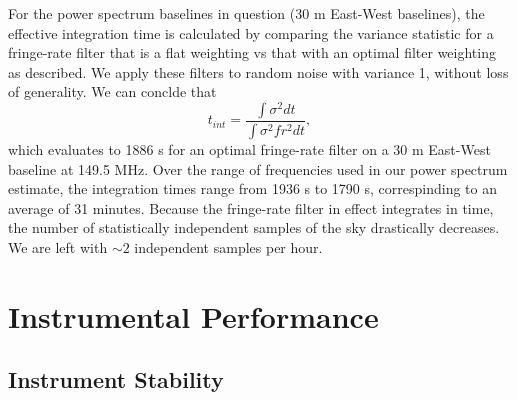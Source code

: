 \documentclass[twocolumn,numberedappendix]{emulateapj} \shorttitle{PSA64}
\begin{document}
For the power spectrum baselines in question (30 m East-West baselines), the
effective integration time is calculated by comparing the variance statistic for
a fringe-rate filter that is a flat weighting vs that with an optimal filter
weighting as described. We apply these filters to random noise with variance 1,
without loss of generality. We can conclde that 
\begin{equation}
    t_{int} = \frac{\int{\sigma^{2}dt}}{\int{\sigma^{2}fr^{2}dt}},
\end{equation}
which evaluates to 1886 s for an optimal fringe-rate filter on a 30 m East-West baseline at 149.5 MHz.
Over the range of frequencies used in our power spectrum estimate, the
integration times range from 1936 s to 1790 s, correspinding to an average of 31
minutes. Because the fringe-rate filter in effect integrates in time, the number
of statistically independent samples of the sky drastically decreases. We are
left with $\sim2$ independent samples per hour.




\section{Instrumental Performance}\label{sec:instrument}
\subsection{Instrument Stability}
\end{document}
